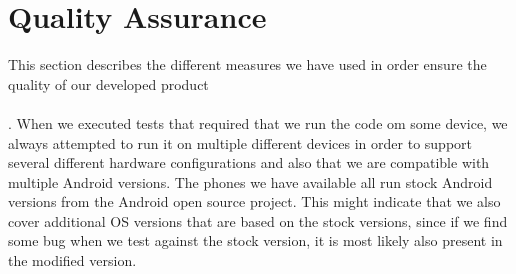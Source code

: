 
\chapter{Quality Assurance}
\label{cha:quality_assurance}

This section describes the different measures we have used in order ensure the quality of our developed product 
\\\\
. 
When we executed tests that required that we run the code om some device, we always attempted to run it on multiple different devices in order to support several different hardware configurations and also that we are compatible with multiple Android versions. The phones we have available all run stock Android versions from the Android open source project. This might indicate that we also cover additional OS versions that are based on the stock versions, since if we find some bug when we test against the stock version, it is most likely also present in the modified version. 








